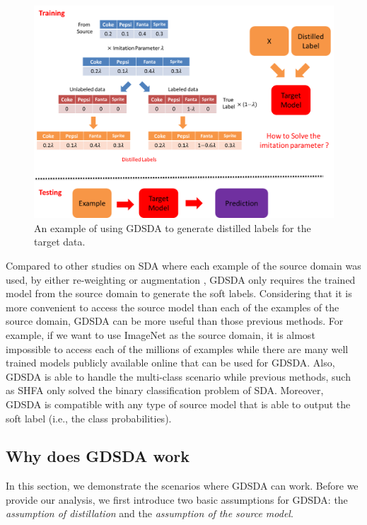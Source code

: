 \begin{figure}
	\centering
	\includegraphics[scale=.6]{aaai/figure/explain.png}
	\caption{An example of using GDSDA to generate distilled labels for the target data.}\label{fig:aaai:explain}
\end{figure}


Compared to other studies on SDA where each example of the source domain was used, by either re-weighting \cite{Donahue_2013_CVPR,duan2012visual} or augmentation \cite{daume2010frustratingly}, GDSDA only requires the trained model from the source domain to generate the soft labels. Considering that it is more convenient to access the source model than each of the examples of the source domain, GDSDA can be more useful than those previous methods. For example, if we want to use ImageNet \cite{imagenet_cvpr09} as the source domain, it is almost impossible to access each of the millions of examples while there are many well trained models publicly available online that can be used for GDSDA. Also, GDSDA is able to handle the multi-class scenario while previous methods, such as SHFA\cite{duan2012learning} only solved the binary classification problem of SDA. Moreover, GDSDA is compatible with any type of source model that is able to output the soft label (i.e., the class probabilities).

\subsection{Why does GDSDA work}
In this section, we demonstrate the scenarios where GDSDA can work. Before we provide our analysis, we first introduce two basic assumptions for GDSDA: the \textit{assumption of distillation} and the \textit{assumption of the source model}.

